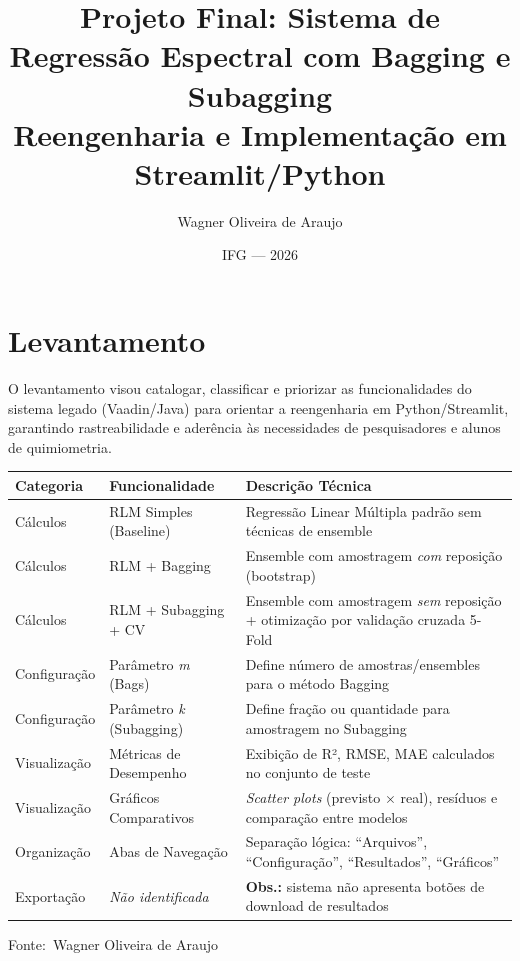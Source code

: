 \documentclass[12pt,a4paper]{article}
\newcommand{\oautor}{Wagner Oliveira de Araujo}
\begin{document}
\title{\textbf{Projeto Final: Sistema de Regressão Espectral com Bagging e Subagging}\\
\small Reengenharia e Implementação em Streamlit/Python}
\author{Wagner Oliveira de Araujo}
\date{IFG --- 2026}
\maketitle
\thispagestyle{empty}

\newpage
\tableofcontents
\newpage

\section{Levantamento}

O levantamento visou catalogar, classificar e priorizar as funcionalidades do sistema legado (Vaadin/Java) para orientar a reengenharia em Python/Streamlit, garantindo rastreabilidade e aderência às necessidades de pesquisadores e alunos de quimiometria.

\begin{quadro}[ht]
\centering
\small
\caption{Inventário das funções do sistema}
\label{quadro:funcoes}
\begin{threeparttable}
\begin{tabularx}{\textwidth}{|l|l|X|} \hline
\textbf{Categoria} & \textbf{Funcionalidade} & \textbf{Descrição Técnica} \\ \hline
Cálculos & RLM Simples (Baseline) & Regressão Linear Múltipla padrão sem técnicas de ensemble \\ \hline
Cálculos & RLM + Bagging & Ensemble com amostragem \textit{com} reposição (bootstrap) \\ \hline
Cálculos & RLM + Subagging + CV & Ensemble com amostragem \textit{sem} reposição + otimização por validação cruzada 5-Fold \\ \hline
Configuração & Parâmetro \textit{m} (Bags) & Define número de amostras/ensembles para o método Bagging \\ \hline
Configuração & Parâmetro \textit{k} (Subagging) & Define fração ou quantidade para amostragem no Subagging \\ \hline
Visualização & Métricas de Desempenho & Exibição de R², RMSE, MAE calculados no conjunto de teste \\ \hline
Visualização & Gráficos Comparativos & \textit{Scatter plots} (previsto $\times$ real), resíduos e comparação entre modelos \\ \hline
Organização & Abas de Navegação & Separação lógica: ``Arquivos'', ``Configuração'', ``Resultados'', ``Gráficos'' \\ \hline
Exportação & \textit{Não identificada} & \textbf{Obs.:} sistema não apresenta botões de download de resultados \\ \hline
\end{tabularx}
\begin{tablenotes}[flushleft]
\footnotesize
\item Fonte:~\oautor
\end{tablenotes}
\end{threeparttable}
\end{quadro}
\end{document}
